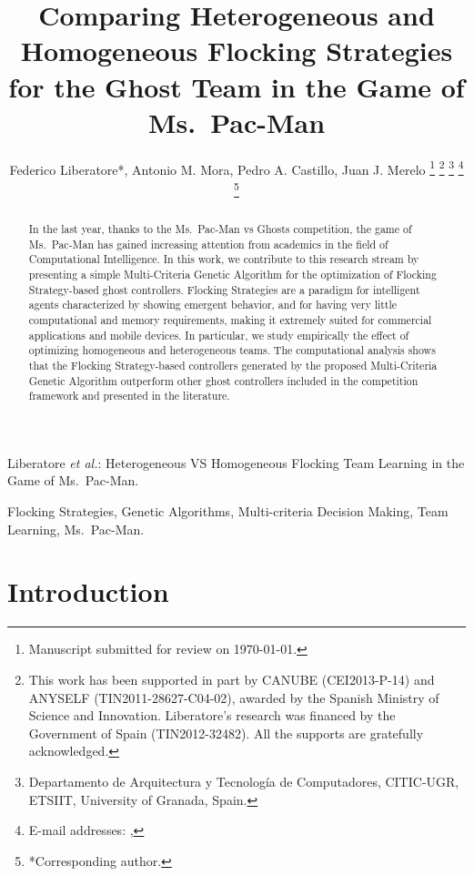 \documentclass[journal]{IEEEtran}
\begin{document}
\title{Comparing Heterogeneous and Homogeneous Flocking Strategies for the Ghost Team in the Game of Ms.\  Pac-Man}

\author{Federico Liberatore*, Antonio M. Mora, Pedro A. Castillo, Juan J. Merelo
\thanks{Manuscript submitted for review on \today.}%
\thanks{This work has been supported in part by CANUBE (CEI2013-P-14) and ANYSELF (TIN2011-28627-C04-02), awarded by the Spanish Ministry of Science and Innovation. Liberatore's research was financed by the Government of Spain (TIN2012-32482). All the supports are gratefully acknowledged.}%
\thanks{Departamento de Arquitectura y Tecnología de Computadores,
CITIC-UGR, ETSIIT,
University of Granada, Spain.}%
\thanks{E-mail addresses: \mailsa, \mailsb}%
\thanks{*Corresponding author.}}

%
{Liberatore \MakeLowercase{\textit{et al.}}: Heterogeneous VS Homogeneous Flocking Team Learning in the Game of Ms.\  Pac-Man.}
\maketitle

\begin{abstract}
In the last year, thanks to the Ms.\  Pac-Man vs Ghosts competition, the
game of Ms.\  Pac-Man has gained increasing attention from academics in
the field of Computational Intelligence. In this work, we contribute
to this research stream by presenting a simple Multi-Criteria Genetic
Algorithm for the optimization of Flocking Strategy-based ghost
controllers. Flocking Strategies are a paradigm for intelligent agents
characterized by showing emergent behavior, and for having very little
computational and memory requirements, making it extremely suited for
commercial applications and mobile devices. In particular, we study
empirically the effect of optimizing homogeneous and heterogeneous
teams. The computational analysis shows that the Flocking
Strategy-based controllers generated by the proposed Multi-Criteria
Genetic Algorithm outperform other ghost controllers
included in the competition framework and presented in the
literature. 
\end{abstract}
\begin{IEEEkeywords}
Flocking Strategies, Genetic Algorithms, Multi-criteria Decision Making, Team Learning, Ms.\  Pac-Man.
\end{IEEEkeywords}

\section{Introduction}
\label{sec:Introduction}
\end{document}
